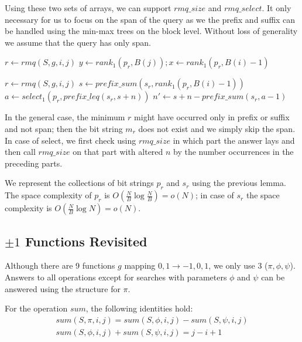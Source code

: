 Using these two sets of arrays, we can support $rmq\_size$ and $rmq\_select$.
It only necessary for us to focus on the span of the query as we the prefix and suffix can be handled using the min-max trees on the block level.
Without loss of generality we assume that the query has only span.

\begin{algorithmic}
	\State $r \gets rmq(S, g, i, j)$
	\State $y \gets rank_1(p_r, B(j)); x \gets rank_1(p_r, B(i) - 1)$
	\State {}
\EndFunction
\end{algorithmic}

\begin{algorithmic}
	\State $r \gets rmq(S, g, i, j)$
	\State $s \gets prefix\_sum(s_r, rank_1(p_r, B(i) - 1))$ 
	\State $a \gets select_1(p_r, prefix\_leq(s_r, s + n))$ 
	\State $n' \gets s + n - prefix\_sum(s_r, a - 1)$ 
	\State {}
\EndFunction
\end{algorithmic}

In the general case, the minimum $r$ might have occurred only in prefix or suffix and not span; then the bit string $m_r$ does not exist and we simply skip the span.
In case of select, we first check using $rmq\_size$ in which part the answer lays and then call $rmq\_size$ on that part with altered $n$ by the number occurrences in the preceding parts.

We represent the collections of bit strings $p_r$ and $s_r$ using the previous lemma. 
The space complexity of $p_r$ is $O\left(\frac{N}{B} \log \frac{N}{B}\right) = o(N)$; in case of $s_r$ the space complexity is $O\left(\frac{N}{B} \log N \right) = o(N)$.

\subsection{$\pm 1$ Functions Revisited}

Although there are 9 functions $g$ mapping ${0, 1} \to {-1, 0, 1}$, we only use 3 ($\pi, \phi, \psi$).
Answers to all operations except for searches with parameters $\phi$ and $\psi$ can be answered using the structure for $\pi$.

For the operation $sum$, the following identities hold:
\begin{gather*}
	sum(S, \pi, i, j) = sum(S, \phi, i, j) - sum(S, \psi, i, j) \\
	sum(S, \phi, i, j) + sum(S, \psi, i, j) = j - i + 1
\end{gather*}

